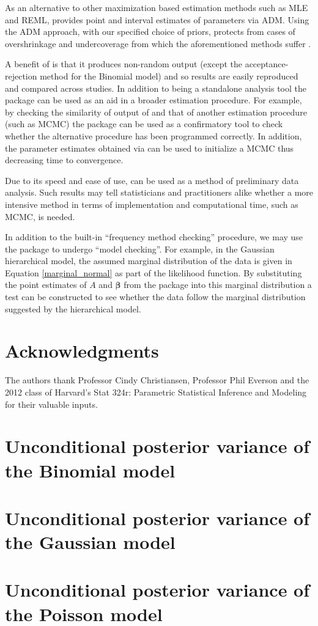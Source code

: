 \documentclass[article]{jss}
\begin{document}
As an alternative to other maximization based estimation methods such as MLE and REML,  provides point and interval estimates of parameters via ADM. Using the ADM approach, with our specified choice of priors, protects from cases of overshrinkage and undercoverage from which the aforementioned methods suffer  \citep{accuracy1988}.


A benefit of  is that it produces non-random output (except the acceptance-rejection method for the Binomial model) and so results are easily reproduced and compared across studies. In addition to being a standalone analysis tool the package can be used as an aid in a broader estimation procedure. For example, by checking the similarity of output of  and that of another estimation procedure (such as MCMC) the package can be used as a confirmatory tool to check whether the alternative procedure has been programmed correctly. In addition, the parameter estimates obtained via  can be used to initialize a MCMC thus decreasing time to convergence. %

Due to its speed and ease of use,  can be used as a method of preliminary data analysis. Such results may tell statisticians and practitioners alike whether a more intensive method in terms of implementation and computational time, such as MCMC, is needed. 


In addition to the built-in ``frequency method checking'' procedure, we may use the package to undergo ``model checking''. For example, in the Gaussian hierarchical model, the assumed marginal distribution of the data is given in Equation \ref{marginal_normal} as part of the likelihood function. By substituting the point estimates of $A$ and $\boldsymbol{\beta}$ from the package into this marginal distribution a test can be constructed to see whether the data follow the marginal distribution suggested by the hierarchical model.


\section[acknowledgments]{Acknowledgments}
The authors thank Professor Cindy Christiansen, Professor Phil Everson and the 2012 class of Harvard's Stat 324r: Parametric Statistical Inference and Modeling for their valuable inputs.

\appendix
\section{Unconditional posterior variance of the Binomial model}\label{apppostvar}
\section{Unconditional posterior variance of the Gaussian model}\label{apppostvar_normal}

\section{Unconditional posterior variance of the Poisson model}\label{apppostvar_poisson}


\end{document}

